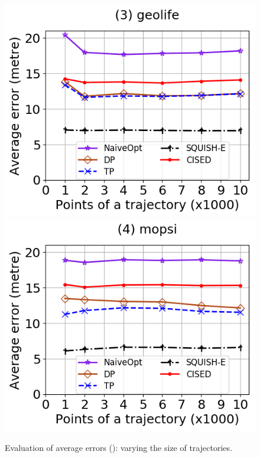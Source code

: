 \begin{figure}[tb!]
	\includegraphics[scale=0.315]{Figures/Exp-SED-error-size-geolife.png}	\hspace{1ex}
	\includegraphics[scale=0.315]{Figures/Exp-SED-error-size-mopsi.png}		
	\vspace{-2.5ex}
	\caption{\small Evaluation of average errors (\sed): varying the size of
    trajectories.}
  \label{fig:ae-sed-size}
	\vspace{-2ex}
\end{figure}


\vspace{-0.5ex}
